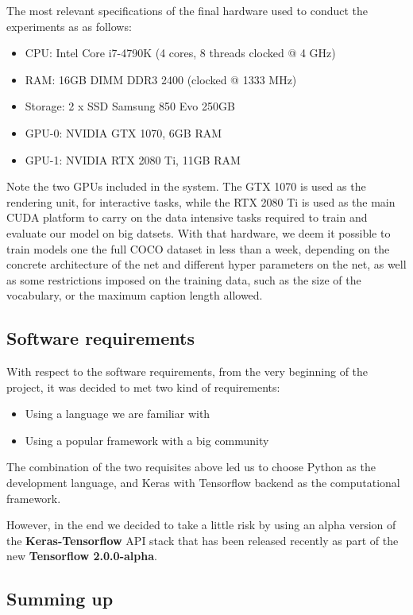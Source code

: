 The most relevant specifications of the final hardware used to conduct the experiments as as follows:

\begin{itemize}
\item CPU: Intel Core i7-4790K (4 cores, 8 threads clocked @ 4 GHz)
\item RAM: 16GB DIMM DDR3 2400 (clocked @ 1333 MHz)
\item Storage: 2 x SSD Samsung 850 Evo 250GB
\item GPU-0: NVIDIA GTX 1070, 6GB RAM
\item GPU-1: NVIDIA RTX 2080 Ti, 11GB RAM
\end{itemize}

Note the two GPUs included in the system. The GTX 1070 is used as the rendering unit, for interactive tasks, while the RTX 2080 Ti is used as the main CUDA platform to carry on the data intensive tasks required to train and evaluate our model on big datsets. With that hardware, we deem it possible to train models one the full COCO dataset in less than a week, depending on the concrete architecture of the net and different hyper parameters on the net, as well as some restrictions imposed on the training data, such as the size of the vocabulary, or the maximum caption length allowed.

\subsection{Software requirements}

With respect to the software requirements, from the very beginning of the project, it was decided to met two kind of requirements:
\begin{itemize}
    \item Using a language we are familiar with
    \item Using a popular framework with a big community 
\end{itemize}

The combination of the two requisites above led us to choose Python as the development language, and Keras with Tensorflow backend as the computational framework. 

However, in the end we decided to take a little risk by using an alpha version of the \textbf{Keras-Tensorflow} API stack that has been released recently as part of the new \textbf{Tensorflow 2.0.0-alpha}.

\subsection{Summing up}


